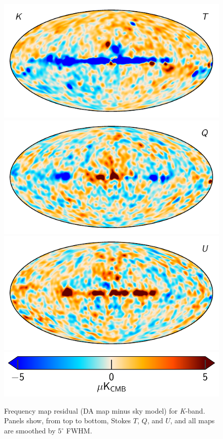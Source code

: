 \documentclass[twocolumn]{../../common/aa}
\newcommand{\K}[0]{\textit K}
\begin{document}
\begin{figure}
	\centering
	\includegraphics[width=\linewidth]{figures/compsep_res_K_I.pdf}\\
        \includegraphics[width=\linewidth]{figures/compsep_res_K_Q.pdf}\\
	\includegraphics[width=\linewidth]{figures/compsep_res_K_U.pdf}\\        
	\includegraphics[width=0.7\linewidth]{figures/cbar_5uK.pdf}
	\caption{Frequency map residual (DA map minus sky model) for \K-band. Panels show, from top to bottom, Stokes $T$, $Q$, and $U$, and all maps are smoothed by $5^\circ$ FWHM.}
	\label{fig:K_compsep_residual}
\end{figure}
\end{document}
